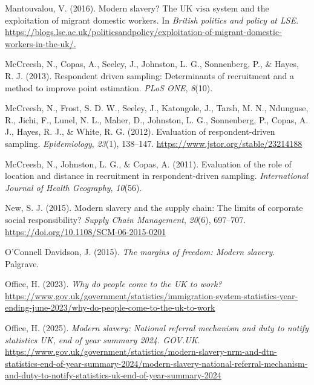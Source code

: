 \documentclass[
  12pt,
]{article}
\newlength{\cslhangindent}
\newenvironment{CSLReferences}[2] %
 {\begin{list}{}{%
  \setlength{\itemindent}{0pt}
  \setlength{\leftmargin}{0pt}
  \setlength{\parsep}{0pt}
  \ifodd #1
   \setlength{\leftmargin}{\cslhangindent}
   \setlength{\itemindent}{-1\cslhangindent}
  \fi
  \setlength{\itemsep}{#2\baselineskip}}}
 {\end{list}}
\theoremstyle{plain}
\theoremstyle{definition}
\begin{document}
\begin{CSLReferences}{1}{0}
Mantouvalou, V. (2016). Modern slavery? The {UK} visa system and the
exploitation of migrant domestic workers. In \emph{British politics and
policy at {LSE}}.
\url{https://blogs.lse.ac.uk/politicsandpolicy/exploitation-of-migrant-domestic-workers-in-the-uk/.}

McCreesh, N., Copas, A., Seeley, J., Johnston, L. G., Sonnenberg, P., \&
Hayes, R. J. (2013). Respondent driven sampling: Determinants of
recruitment and a method to improve point estimation. \emph{{PLoS}
{ONE}}, \emph{8}(10).

McCreesh, N., Frost, S. D. W., Seeley, J., Katongole, J., Tarsh, M. N.,
Ndunguse, R., Jichi, F., Lunel, N. L., Maher, D., Johnston, L. G.,
Sonnenberg, P., Copas, A. J., Hayes, R. J., \& White, R. G. (2012).
Evaluation of respondent-driven sampling. \emph{Epidemiology},
\emph{23}(1), 138--147. \url{https://www.jstor.org/stable/23214188}

McCreesh, N., Johnston, L. G., \& Copas, A. (2011). Evaluation of the
role of location and distance in recruitment in respondent-driven
sampling. \emph{International Journal of Health Geography},
\emph{10}(56).

New, S. J. (2015). Modern slavery and the supply chain: The limits of
corporate social responsibility? \emph{Supply Chain Management},
\emph{20}(6), 697--707. \url{https://doi.org/10.1108/SCM-06-2015-0201}

O'Connell Davidson, J. (2015). \emph{The margins of freedom: Modern
slavery}. Palgrave.

Office, H. (2023). \emph{Why do people come to the {UK} to work?}
\url{https://www.gov.uk/government/statistics/immigration-system-statistics-year-ending-june-2023/why-do-people-come-to-the-uk-to-work}

Office, H. (2025). \emph{Modern slavery: National referral mechanism and
duty to notify statistics {UK}, end of year summary 2024. {GOV}.{UK}}.
\url{https://www.gov.uk/government/statistics/modern-slavery-nrm-and-dtn-statistics-end-of-year-summary-2024/modern-slavery-national-referral-mechanism-and-duty-to-notify-statistics-uk-end-of-year-summary-2024}


\end{CSLReferences}
\end{document}
